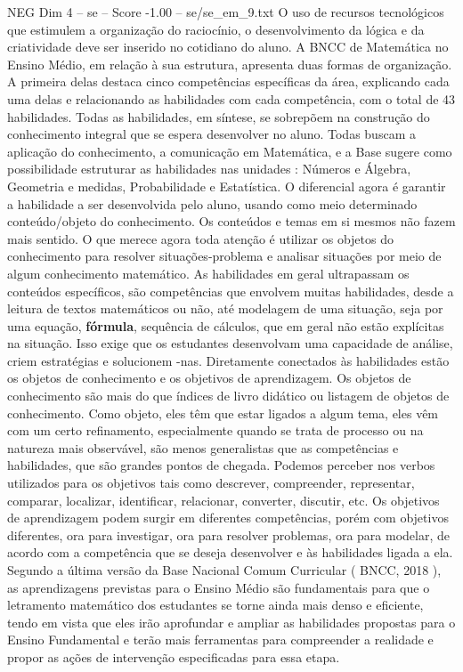 \begin{textsample}{NEG Dim 4 – se – Score -1.00 – se/se\_em\_9.txt}
O uso de recursos tecnológicos que estimulem a organização do raciocínio, o desenvolvimento da lógica e da criatividade deve ser inserido no cotidiano do aluno.
A BNCC de Matemática no Ensino Médio, em relação à sua estrutura, apresenta duas formas de organização.
A primeira delas destaca cinco competências específicas da área, explicando cada uma delas e relacionando as habilidades com cada competência, com o total de 43 habilidades.
Todas as habilidades, em síntese, se sobrepõem na construção do conhecimento integral que se espera desenvolver no aluno.
Todas buscam a aplicação do conhecimento, a comunicação em Matemática, e a Base sugere como possibilidade estruturar as habilidades nas unidades : Números e Álgebra, Geometria e medidas, Probabilidade e Estatística.
O diferencial agora é garantir a habilidade a ser desenvolvida pelo aluno, usando como meio determinado conteúdo/objeto do conhecimento.
Os conteúdos e temas em si mesmos não fazem mais sentido.
O que merece agora toda atenção é utilizar os objetos do conhecimento para resolver situações-problema e analisar situações por meio de algum conhecimento matemático.
As habilidades em geral ultrapassam os conteúdos específicos, são competências que envolvem muitas habilidades, desde a leitura de textos matemáticos ou não, até modelagem de uma situação, seja por uma equação, \textbf{fórmula}, sequência de cálculos, que em geral não estão explícitas na situação.
Isso exige que os estudantes desenvolvam uma capacidade de análise, criem estratégias e solucionem -nas.
Diretamente conectados às habilidades estão os objetos de conhecimento e os objetivos de aprendizagem.
Os objetos de conhecimento são mais do que índices de livro didático ou listagem de objetos de conhecimento.
Como objeto, eles têm que estar ligados a algum tema, eles vêm com um certo refinamento, especialmente quando se trata de processo ou na natureza mais observável, são menos generalistas que as competências e habilidades, que são grandes pontos de chegada.
Podemos perceber nos verbos utilizados para os objetivos tais como descrever, compreender, representar, comparar, localizar, identificar, relacionar, converter, discutir, etc.
Os objetivos de aprendizagem podem surgir em diferentes competências, porém com objetivos diferentes, ora para investigar, ora para resolver problemas, ora para modelar, de acordo com a competência que se deseja desenvolver e às habilidades ligada a ela.
Segundo a última versão da Base Nacional Comum Curricular ( BNCC, 2018 ), as aprendizagens previstas para o Ensino Médio são fundamentais para que o letramento matemático dos estudantes se torne ainda mais denso e eficiente, tendo em vista que eles irão aprofundar e ampliar as habilidades propostas para o Ensino Fundamental e terão mais ferramentas para compreender a realidade e propor as ações de intervenção especificadas para essa etapa.

\end{textsample}
